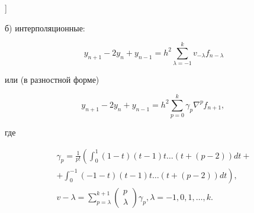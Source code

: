 \documentclass[10pt]{article}
\begin{document}
]



б) интерполяционные:



\[

y_{n+1}-2 y_{n}+y_{n-1}=h^{2} \sum_{\lambda=-1}^{k} v_{-\lambda} f_{n-\lambda}

\]



или (в разностной форме)



\[

y_{n+1}-2 y_{n}+y_{n-1}=h^{2} \sum_{p=0}^{k} \gamma_{p} \nabla^{p} f_{n+1} \text {, }

\]



где



\[

\begin{gathered}

\gamma_{p}=\frac{1}{p !}\left(\int_{0}^{1}(1-t)(t-1) t \ldots(t+(p-2)) d t+\right. \\

\left.+\int_{0}^{-1}(-1-t)(t-1) t \ldots(t+(p-2)) d t\right), \\

v-\lambda=\sum_{p=\lambda}^{k+1}\left(\begin{array}{l}

p \\

\lambda

\end{array}\right) \gamma_{p}, \lambda=-1,0,1, \ldots, k .

\end{gathered}

\]
\end{document}
